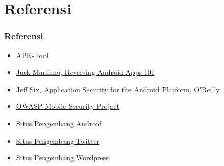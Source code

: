 \documentclass[xcolor=pdftex,table,10pt]{beamer}
\begin{document}
\section{Referensi}
\begin{frame}
	 \frametitle{Referensi}
	\begin{itemize}	
		\item {\href{http://code.google.com/p/android-apktool}{APK-Tool}}
		\item {\href{http://jack-mannino.blogspot.com/2010/09/reversing-android-apps-101.html}{Jack Maninno, Reversing Android Apps 101}}			
		\item {\href{http://www.amazon.com/Application-Security-Android-Platform-Permissions/dp/1449315070}{Jeff Six, Application Security for the Android Platform, O'Reilly}}
		\item {\href{https://www.owasp.org/index.php/OWASP_Mobile_Security_Project}{OWASP Mobile Security Project}}
		\item {\href{http://developer.android.com}{Situs Pengembang Android}}	
		\item {\href{https://dev.twitter.com}{Situs Pengembang Twitter}}
		\item {\href{http://dev.android.wordpress.org/}{Situs Pengembang Wordpress}}	
	\end{itemize}
\end{frame}

\end{document}
